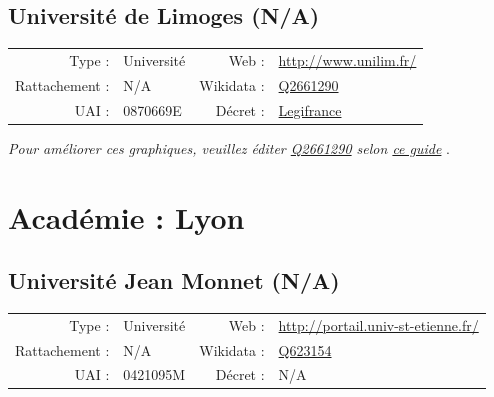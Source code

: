 \documentclass[12pt,french,landscape]{article}
\begin{document}
\hypertarget{universituxe9-de-limoges-na}{%
\subsection{Université de Limoges
(N/A)}\label{universituxe9-de-limoges-na}}

\begin{tabular*}{0.45\textwidth}{rp{2cm}rl}  
\hline  
Type : & Université & Web : &\href{http://www.unilim.fr/}{http://www.unilim.fr/} \\  
Rattachement : & N/A & Wikidata : & \href{https://www.wikidata.org/entity/Q2661290}{Q2661290} \\  
UAI : & 0870669E & Décret : & \href{https://www.legifrance.gouv.fr/eli/decret/2016/12/15/MENS1630827D/jo/texte/fr}{Legifrance} \\  
\hline  
\end{tabular*}

\textit{\scriptsize Pour améliorer ces graphiques, veuillez éditer \href{https://www.wikidata.org/entity/Q2661290}{Q2661290}  selon \href{https://github.com/cpesr/wikidataESR/blob/master/Rmd/wikidataESR.md}{ce guide}}
.


\newpage

\hypertarget{acaduxe9mie-lyon}{%
\section{Académie : Lyon}\label{acaduxe9mie-lyon}}

\hypertarget{universituxe9-jean-monnet-na}{%
\subsection{Université Jean Monnet
(N/A)}\label{universituxe9-jean-monnet-na}}

\begin{tabular*}{0.45\textwidth}{rp{2cm}rl}  
\hline  
Type : & Université & Web : &\href{http://portail.univ-st-etienne.fr/}{http://portail.univ-st-etienne.fr/} \\  
Rattachement : & N/A & Wikidata : & \href{https://www.wikidata.org/entity/Q623154}{Q623154} \\  
UAI : & 0421095M & Décret : & N/A \\  
\hline  
\end{tabular*}
\end{document}
